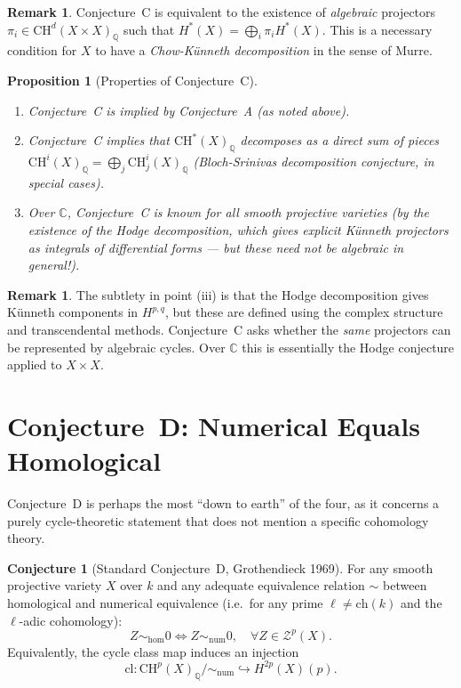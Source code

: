 \documentclass[12pt,a4paper]{amsart}
\newtheorem{proposition}[theorem]{Proposition}
\theoremstyle{definition}
\newtheorem{remark}[theorem]{Remark}
\newtheorem{conjecture}[theorem]{Conjecture}
\newcommand{\Q}{\mathbb{Q}}
\newcommand{\C}{\mathbb{C}}
\newcommand{\ch}{\mathrm{ch}}
\newcommand{\CH}{\mathrm{CH}}
\newcommand{\cl}{\mathrm{cl}}
\begin{document}
\begin{remark}
Conjecture~C is equivalent to the existence of \emph{algebraic} projectors
$\pi_i \in \CH^d(X \times X)_\Q$ such that $H^*(X) = \bigoplus_i \pi_i H^*(X)$.
This is a necessary condition for $X$ to have a \emph{Chow-K\"unneth
decomposition} in the sense of Murre.
\end{remark}

\begin{proposition}[Properties of Conjecture~C]
\begin{enumerate}[label=(\roman*)]
  \item Conjecture~C is implied by Conjecture~A (as noted above).
  \item Conjecture~C implies that $\CH^*(X)_\Q$ decomposes as a direct sum
        of pieces $\CH^i(X)_\Q = \bigoplus_j \CH^i_j(X)_\Q$ (Bloch-Srinivas
        decomposition conjecture, in special cases).
  \item Over $\C$, Conjecture~C is known for all smooth projective varieties
        (by the existence of the Hodge decomposition, which gives explicit
        K\"unneth projectors as integrals of differential forms --- but these
        need not be algebraic in general!).
\end{enumerate}
\end{proposition}

\begin{remark}
The subtlety in point (iii) is that the Hodge decomposition gives K\"unneth
components in $H^{p,q}$, but these are defined using the complex structure and
transcendental methods.  Conjecture~C asks whether the \emph{same} projectors
can be represented by algebraic cycles.  Over $\C$ this is essentially the
Hodge conjecture applied to $X \times X$.
\end{remark}

\section{Conjecture~D: Numerical Equals Homological}\label{sec:conjD}

Conjecture~D is perhaps the most ``down to earth'' of the four, as it concerns
a purely cycle-theoretic statement that does not mention a specific cohomology
theory.

\begin{conjecture}[Standard Conjecture~D, Grothendieck 1969]\label{conj:D}
For any smooth projective variety $X$ over $k$ and any adequate equivalence
relation $\sim$ between homological and numerical equivalence (i.e.\ for any
prime $\ell \neq \ch(k)$ and the $\ell$-adic cohomology):
\[
  Z \sim_{\mathrm{hom}} 0 \iff Z \sim_{\mathrm{num}} 0,
  \quad \forall Z \in \mathcal{Z}^p(X).
\]
Equivalently, the cycle class map induces an injection
\[
  \cl: \CH^p(X)_\Q / {\sim_{\mathrm{num}}} \hookrightarrow H^{2p}(X)(p).
\]
\end{conjecture}
\end{document}
